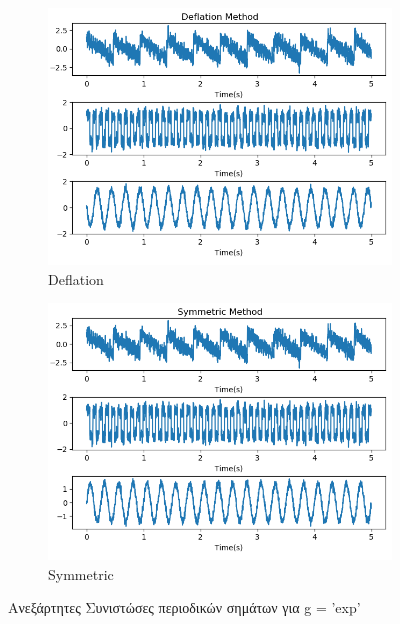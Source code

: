 \begin{figure}[H]
    \centering
    \begin{subfigure}{0.48 \textwidth}
        \centering
       \includegraphics[width=\textwidth]{fwto/defla_ica_1_exp.png} \en
        \caption{Deflation} \gr
        \label{fig:5.3a}
    \end{subfigure}%
    \hfill
    \begin{subfigure}{0.48 \textwidth}
        \centering
       \includegraphics[width=\textwidth]{fwto/Symmetric_ica_1_exp.png}
        \en
        \caption{Symmetric} \gr
        \label{fig:5.3b}
    \end{subfigure}%
    \gr
    \caption{Ανεξάρτητες Συνιστώσες περιοδικών σημάτων για \en g = 'exp' \gr}
\end{figure}
